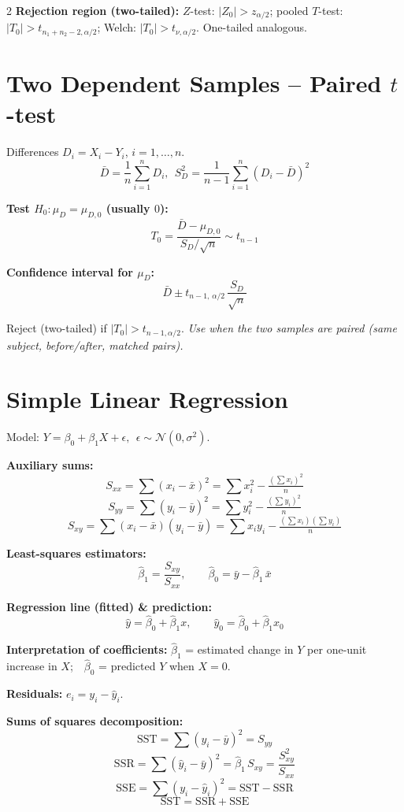 \documentclass[9pt,a4paper]{extarticle}
\newcommand{\sh}[1]{\textbf{\color{BrickRed} #1}}
\begin{document}
\begin{multicols*}{2}
\sh{Rejection region (two-tailed):}
$Z$-test: $|Z_0|>z_{\alpha/2}$; pooled $T$-test: $|T_0|>t_{n_1+n_2-2,\alpha/2}$; Welch: $|T_0|>t_{\nu,\alpha/2}$. One-tailed analogous.

\section{Two Dependent Samples -- Paired $t$-test}

Differences $D_i=X_i-Y_i$, $i=1,\dots,n$.
\[
\bar{D}=\frac{1}{n}\sum_{i=1}^{n}D_i,\ \ S_D^{2}=\frac{1}{n-1}\sum_{i=1}^{n}(D_i-\bar{D})^{2}
\]

\sh{Test $H_0:\mu_D=\mu_{D,0}$ (usually $0$):}
\[
T_0=\frac{\bar{D}-\mu_{D,0}}{S_D/\sqrt{n}}\sim t_{n-1}
\]

\sh{Confidence interval for $\mu_D$:}
\[
\bar{D}\pm t_{n-1,\,\alpha/2}\,\frac{S_D}{\sqrt{n}}
\]

Reject (two-tailed) if $|T_0|>t_{n-1,\alpha/2}$.
\textit{Use when the two samples are paired (same subject, before/after, matched pairs).}

\section{Simple Linear Regression}

Model: $Y=\beta_0+\beta_1 X+\epsilon,\ \ \epsilon\sim\mathcal{N}(0,\sigma^{2})$.

\sh{Auxiliary sums:}
\[
S_{xx}=\sum(x_i-\bar{x})^{2}=\sum x_i^{2}-\tfrac{(\sum x_i)^{2}}{n}
\]
\[
S_{yy}=\sum(y_i-\bar{y})^{2}=\sum y_i^{2}-\tfrac{(\sum y_i)^{2}}{n}
\]
\[
S_{xy}=\sum(x_i-\bar{x})(y_i-\bar{y})=\sum x_i y_i-\tfrac{(\sum x_i)(\sum y_i)}{n}
\]

\sh{Least-squares estimators:}
\[
\hat{\beta}_1=\frac{S_{xy}}{S_{xx}},\qquad
\hat{\beta}_0=\bar{y}-\hat{\beta}_1\,\bar{x}
\]

\sh{Regression line (fitted) \& prediction:}
\[
\hat{y}=\hat{\beta}_0+\hat{\beta}_1 x,\qquad
\hat{y}_0=\hat{\beta}_0+\hat{\beta}_1 x_0
\]

\sh{Interpretation of coefficients:}
$\hat{\beta}_1$ = estimated change in $Y$ per one-unit increase in $X$;\ \ $\hat{\beta}_0$ = predicted $Y$ when $X=0$.

\sh{Residuals:} $e_i=y_i-\hat{y}_i$.

\sh{Sums of squares decomposition:}
\[
\mathrm{SST}=\sum(y_i-\bar{y})^{2}=S_{yy}
\]
\[
\mathrm{SSR}=\sum(\hat{y}_i-\bar{y})^{2}=\hat{\beta}_1\,S_{xy}=\frac{S_{xy}^{2}}{S_{xx}}
\]
\[
\mathrm{SSE}=\sum(y_i-\hat{y}_i)^{2}=\mathrm{SST}-\mathrm{SSR}
\]
\[
\boxed{\mathrm{SST}=\mathrm{SSR}+\mathrm{SSE}}
\]


\end{multicols*}
\end{document}
